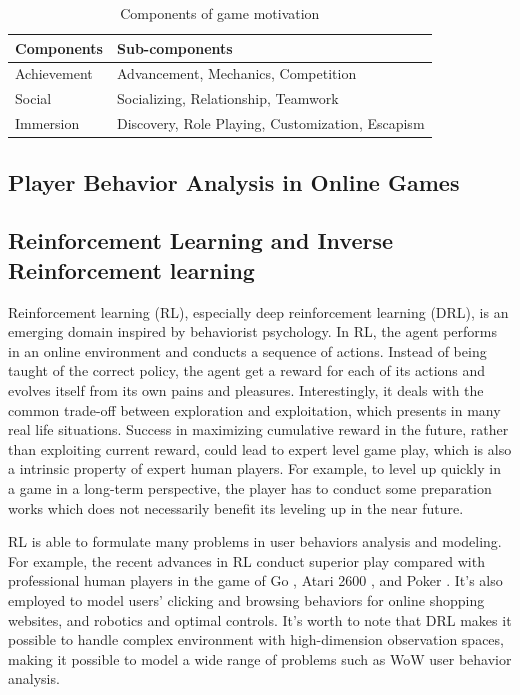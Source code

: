 \documentclass{sigchi}
\begin{document}
\begin{table}
\caption{Components of game motivation}
\begin{tabularx}{\textwidth}{lX}
    Components & Sub-components \\
    \midrule
    Achievement & Advancement, Mechanics, Competition \\
    Social & Socializing, Relationship, Teamwork \\
    Immersion & Discovery, Role Playing, Customization, Escapism
    \label{tbl:components}
\end{tabularx}
\end{table}

\subsection{Player Behavior Analysis in Online Games}



\subsection{Reinforcement Learning and Inverse Reinforcement learning}

Reinforcement learning (RL), especially deep reinforcement learning (DRL), is an emerging domain inspired by behaviorist psychology. 
In RL, the agent performs in an online environment and conducts a sequence of actions.
Instead of being taught of the correct policy, the agent get a reward for each of its actions and evolves itself from its own pains and pleasures.
Interestingly, it deals with the common trade-off between exploration and exploitation, which presents in many real life situations.
Success in maximizing cumulative reward in the future, rather than exploiting current reward, could lead to expert level game play, which is also a intrinsic property of expert human players.
For example, to level up quickly in a game in a long-term perspective, the player has to conduct some preparation works which does not necessarily benefit its leveling up in the near future.

RL is able to formulate many problems in user behaviors analysis and modeling.
For example, the recent advances in RL conduct superior play compared with professional human players in the game of Go \cite{silver2016mastering}, Atari 2600 \cite{mnih2015human}, and Poker \cite{heinrich2016deep}.
It's also employed to model users' clicking and browsing behaviors for online shopping websites, and robotics and optimal controls.
It's worth to note that DRL makes it possible to handle complex environment with high-dimension observation spaces, making it possible to model a wide range of problems such as WoW user behavior analysis.
\end{document}

